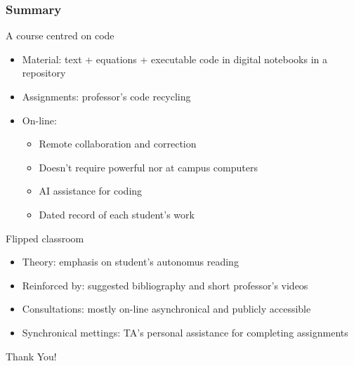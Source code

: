 \documentclass[aspectratio=169]{beamer}
\begin{document}
\begin{frame}
	\frametitle{Summary}
	\begin{block}{A course centred on code}
		\begin{itemize}[<+->]
			\item Material: text + equations + executable code in digital notebooks in a repository
			\item Assignments: professor's code recycling
			\item On-line:
			\begin{itemize}[<+->]
				\item Remote collaboration and correction
				\item Doesn't require powerful nor at campus computers
				\item AI assistance for coding
				\item Dated record of each student's work
			\end{itemize}
		\end{itemize}
	\end{block}
	\begin{block}{Flipped classroom}
		\begin{itemize}[<+->]
			\item Theory: emphasis on student's autonomus reading
			\item Reinforced by: suggested bibliography and short professor's videos
			\item Consultations: mostly on-line asynchronical and publicly accessible
			\item Synchronical mettings: TA's personal assistance for completing assignments
		\end{itemize}
	\end{block}
\end{frame}


\begin{frame}%
    \begin{center}
    \Huge Thank You!
    \end{center}
\end{frame}
\end{document}
